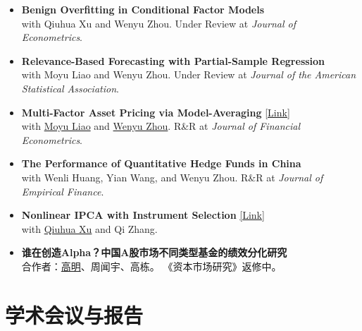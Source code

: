 \documentclass[11pt, a4paper]{article}
\begin{document}
\begin{itemize}[itemsep=5pt, topsep=5pt]


  \item \textbf{Benign Overfitting in Conditional Factor Models}\\[4pt]
    with Qiuhua Xu and Wenyu Zhou. Under Review at \textit{Journal of Econometrics}.

  \item \textbf{Relevance-Based Forecasting with Partial-Sample Regression}\\[4pt]
    with {Moyu Liao} and
    {Wenyu Zhou}.
    Under Review at \textit{Journal of the American Statistical \mbox{Association}}.

  \item \textbf{Multi-Factor Asset Pricing via Model-Averaging}
    \href{https://www.jianguoyun.com/p/DbF1rJUQ0KLMDRjXyaQGIAA}{[Link]}\\[4pt]
    with \href{https://liaomoyu.weebly.com/}{Moyu Liao} and
    \href{https://person.zju.edu.cn/wenyuzhou}{Wenyu Zhou}.
    R\&R at \textit{Journal of Financial Econometrics}.  

  \item \textbf{The Performance of Quantitative Hedge Funds in China}\\[4pt]
    with Wenli Huang, Yian Wang, and Wenyu Zhou.
    R\&R at \textit{Journal of Empirical Finance}.

  \item \textbf{Nonlinear IPCA with Instrument Selection}
    \href{https://www.jianguoyun.com/p/Ddb63f0QyMuCDhjdsKkGIAA}{[Link]}\\[4pt]
    with \href{https://jinrong.swufe.edu.cn/info/2039/23537.htm}{Qiuhua Xu} and Qi Zhang.

  \item \textbf{谁在创造Alpha？中国A股市场不同类型基金的绩效分化研究}\\[4pt]
    合作者：\href{http://scholar.pku.edu.cn/gao}{高明}、周闻宇、高栋。 《资本市场研究》返修中。  

\end{itemize}

\section{学术会议与报告}
\end{document}
